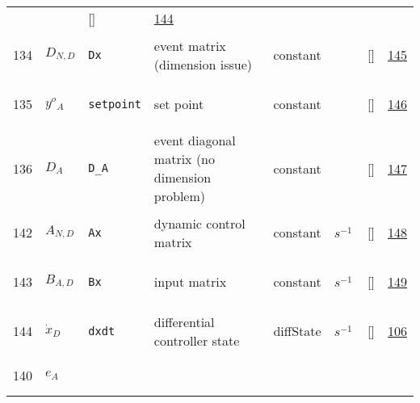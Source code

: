 \begin{longtable}{|p{1cm}|p{3cm}|p{3cm}|p{7cm}|p{3.0cm}|p{3cm}|p{2cm}|p{1cm}|}
             & $  $
             & []
             & \hyperlink{"e:144"}{ 144 }
                 \\
    134
             & \hypertarget{"v:134"}{ $ {D}{_{N, D}} $}
             & \verb|Dx|
             & event matrix (dimension issue)
             & \begin{lay}constant \end{lay}
             & $  $
             & []
             & \hyperlink{"e:145"}{ 145 }
                 \\
    135
             & \hypertarget{"v:135"}{ $ {y^o}{_{A}} $}
             & \verb|setpoint|
             & set point
             & \begin{lay}constant \end{lay}
             & $  $
             & []
             & \hyperlink{"e:146"}{ 146 }
                 \\
    136
             & \hypertarget{"v:136"}{ $ {D}{_{A}} $}
             & \verb|D_A|
             & event diagonal matrix (no dimension problem)
             & \begin{lay}constant \end{lay}
             & $  $
             & []
             & \hyperlink{"e:147"}{ 147 }
                 \\
    142
             & \hypertarget{"v:142"}{ $ {A}{_{N, D}} $}
             & \verb|Ax|
             & dynamic control matrix
             & \begin{lay}constant \end{lay}
             & $ s^{-1} \, $
             & []
             & \hyperlink{"e:148"}{ 148 }
                 \\
    143
             & \hypertarget{"v:143"}{ $ {B}{_{A, D}} $}
             & \verb|Bx|
             & input matrix
             & \begin{lay}constant \end{lay}
             & $ s^{-1} \, $
             & []
             & \hyperlink{"e:149"}{ 149 }
                 \\
    144
             & \hypertarget{"v:144"}{ $ {\dot{x}}{_{D}} $}
             & \verb|dxdt|
             & differential controller state
             & \begin{lay}diffState \end{lay}
             & $ s^{-1} \, $
             & []
             & \hyperlink{"e:106"}{ 106 }
                 \\
    140
             & \hypertarget{"v:140"}{ $ {e}{_{A}} $}

\end{longtable}
